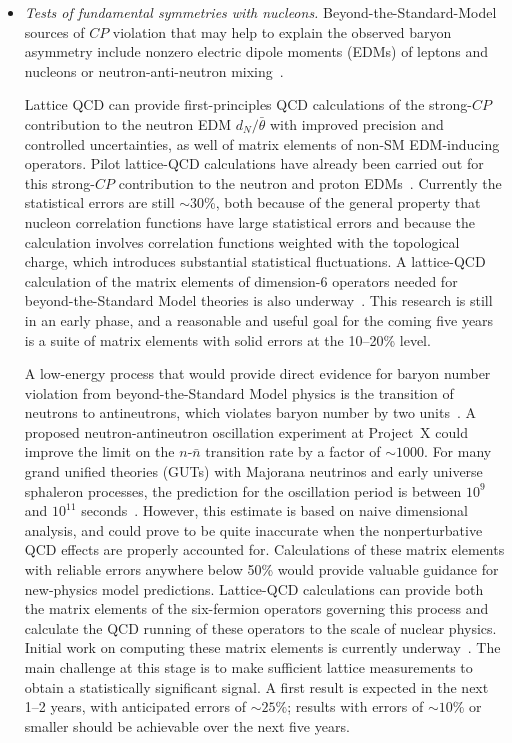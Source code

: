\begin{itemize}
\item {\it Tests of fundamental symmetries with nucleons.}
Beyond-the-Standard-Model sources of $CP$ violation that may help to explain
the observed baryon asymmetry include nonzero electric dipole moments (EDMs)
of leptons and nucleons \cite{Pospelov:2005pr} or neutron-anti-neutron
mixing~\cite{Mohapatra:1980qe}.

Lattice QCD can provide first-principles QCD calculations of the strong-$CP$
contribution to the neutron EDM $d_N/\bar{\theta}$ with improved precision and
controlled uncertainties, as well of matrix elements of non-SM EDM-inducing
operators.  Pilot lattice-QCD calculations have already been carried out for
this strong-$CP$ contribution to the neutron and proton
EDMs~\cite{Shintani:2008nt,Shintani:2005xg,Aoki:2008gv}.  Currently the
statistical errors are still $\sim$30\%, both because of the general property
that nucleon correlation functions have large statistical errors and because
the calculation involves correlation functions weighted with the topological
charge, which introduces substantial statistical fluctuations.  A lattice-QCD
calculation of the matrix elements of dimension-6 operators needed for
beyond-the-Standard Model theories is also
underway~\cite{Bhattacharya:2012bf}. This research is still in an early phase,
and a reasonable and useful goal for the coming five years is a suite of
matrix elements with solid errors at the 10--20\% level.

A low-energy process that would provide direct evidence for baryon number
violation from beyond-the-Standard Model physics is the transition of neutrons
to antineutrons, which violates baryon number by two
units~\cite{Mohapatra:1980qe}.  A proposed neutron-antineutron oscillation
experiment at Project~X could improve the limit on the $n$-$\bar{n}$
transition rate by a factor of $\sim 1000$.  For many grand unified theories
(GUTs) with Majorana neutrinos and early universe sphaleron processes, the
prediction for the oscillation period is between $10^9$ and $10^{11}$
seconds~\cite{Nussinov:2001rb,%
Babu:2008rq,Mohapatra:2009wp,Winslow:2010wf,Babu:2012vc}.  However, this
estimate is based on naive dimensional analysis, and could prove to be quite
inaccurate when the nonperturbative QCD effects are properly accounted for.
Calculations of these matrix elements with reliable errors anywhere below 50\%
would provide valuable guidance for new-physics model predictions.
Lattice-QCD calculations can provide both the matrix elements of the
six-fermion operators governing this process and calculate the QCD running of
these operators to the scale of nuclear physics.  Initial work on computing
these matrix elements is currently underway~\cite{Buchoff:2012bm}.  The main
challenge at this stage is to make sufficient lattice measurements to obtain a
statistically significant signal. A first result is expected in the next 1--2
years, with anticipated errors of $\sim 25\%$; results with errors of $\sim
10\%$ or smaller should be achievable over the next five years.

\end{itemize}

